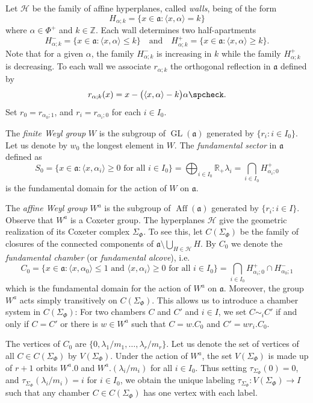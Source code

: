 \documentclass[11pt]{amsart}
\newcommand{\RR}{\mathbb{R}}
\newcommand{\ZZ}{\mathbb{Z}}
\newcommand{\calH}{\mathcal{H}}
\newcommand{\frakA}{\mathfrak{a}}
\newcommand{\GL}{\operatorname{GL}}
\newcommand{\Aff}{\operatorname{Aff}}
\newcommand{\sprod}[2]{\langle {#1}, {#2} \rangle}
\theoremstyle{plain}
\theoremstyle{definition}
\numberwithin{equation}{section}
\begin{document}
Let $\calH$ be the family of affine hyperplanes, called \emph{walls}, being of the form
\[
	H_{\alpha; k} = \big\{x \in \frakA : \langle x, \alpha \rangle = k \big\}
\]
where $\alpha \in \Phi^+$ and $k \in \ZZ$. Each wall determines two half-apartments
\[
	H^-_{\alpha; k} = \big\{x \in \frakA : \langle x, \alpha \rangle \leqslant k\big\}
	\quad\text{and}\quad
	H^+_{\alpha; k} = \big\{x \in \frakA : \langle x, \alpha \rangle \geqslant k\big\}.
\]
Note that for a given $\alpha$, the family $H^-_{\alpha; k}$ is increasing in $k$ while the family $H^+_{\alpha; k}$ is
decreasing. To each wall we associate $r_{\alpha; k}$ the orthogonal reflection in $\frakA$
defined by 
\[
	r_{\alpha; k}(x) = x - \big(\sprod{x}{\alpha} - k\big)\alpha\spcheck.
\]
Set $r_0 = r_{\alpha_0; 1}$, and $r_i = r_{\alpha_i; 0}$ for each $i \in I_0$. 
	
The \emph{finite Weyl group} $W$ is the subgroup of $\GL(\mathfrak{a})$ generated by $\{r_i: i \in I_0\}$. Let us denote
by $w_0$ the longest element in $W$. The \emph{fundamental sector} in $\frakA$ defined as
\[
	S_0 = \big\{x \in \frakA : \sprod{x}{\alpha_i} \geqslant 0 \text{ for all } i \in I_0\big\} 
	= \bigoplus_{i \in I_0} \RR_+ \lambda_i 
	= \bigcap_{i \in I_0} H^+_{\alpha_i; 0}
\]
is the fundamental domain for the action of $W$ on $\frakA$.
	
The \emph{affine Weyl group} $W^a$ is the subgroup of $\Aff(\mathfrak{a})$ generated by $\{r_i: i \in I\}$. Observe that 
$W^a$ is a Coxeter group. The hyperplanes $\calH$ give the geometric realization of its Coxeter complex $\Sigma_\Phi$. To see
this, let $C(\Sigma_\Phi)$ be the family of closures of the connected components of
$\frakA \setminus \bigcup_{H \in \calH} H$. By $C_0$ we denote the \emph{fundamental chamber} (or \emph{fundamental alcove}), 
i.e.
\[
	C_0 = \big\{x \in \frakA : \sprod{x}{\alpha_0} \leqslant 1 \text{ and } \sprod{x}{\alpha_i} \geqslant 0 \text{ for all } 
	i \in I_0\big\} = \bigcap_{i \in I_0} H^+_{\alpha_i; 0}  \cap H^-_{\alpha_0; 1}
\]
which is the fundamental domain for the action of $W^a$ on $\frakA$. Moreover, the group $W^a$ acts simply transitively 
on $C(\Sigma_\Phi)$. This allows us to introduce a chamber system in $C(\Sigma_\Phi)$: For two chambers $C$ and $C'$ and
$i \in I$, we set $C \sim_i C'$ if and only if $C = C'$ or there is $w \in W^a$ such that $C = w . C_0$ and
$C' = w r_i . C_0$. 
	
The vertices of $C_0$ are $\{0, \lambda_1/m_1, \ldots, \lambda_r/m_r\}$. Let us denote the set of vertices of all 
$C \in C(\Sigma_\Phi)$ by $V(\Sigma_\Phi)$. Under the action of $W^a$, the set $V(\Sigma_\Phi)$ is made up of $r+1$
orbits $W^a.0$ and $W^a.(\lambda_i/m_i)$ for all $i \in I_0$. Thus setting $\tau_{\Sigma_\Phi}(0) = 0$, and
$\tau_{\Sigma_\Phi}(\lambda_i/m_i) = i$ for $i \in I_0$, we obtain the unique labeling
$\tau_{\Sigma_\Phi} : V(\Sigma_\Phi) \rightarrow I$ such that any chamber $C \in C(\Sigma_\Phi)$ has one vertex with each label. 
	
\end{document}
